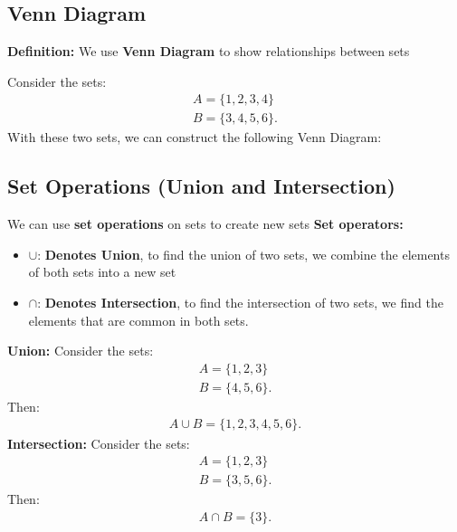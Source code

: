\documentclass{report}
\begin{document}
    \pagebreak \bigbreak \noindent
    \subsection{Venn Diagram}
    \smallbreak \noindent
    \begin{mdframed}
        \textbf{Definition:}
         We use \textbf{Venn Diagram} to show relationships between sets
    \end{mdframed}
    \bigbreak \noindent 
    Consider the sets:
    \begin{align*}
        A = \{1,2,3,4\} \\
        B = \{3,4,5,6\}
    .\end{align*}
    With these two sets, we can construct the following Venn Diagram:
    \begin{figure}[ht]
        \centering
        \label{fig:venn}
    \end{figure}

    \bigbreak \noindent \bigbreak \noindent 
    \subsection{Set Operations (Union and Intersection)}
    \bigbreak \noindent 
    We can use \textbf{set operations} on sets to create new sets
    \bigbreak \noindent 
    \textbf{Set operators:}
    \begin{itemize}
        \item $\cup$: \textbf{Denotes Union}, to find the union of two sets, we combine the elements of both sets into a new set
        \item $\cap$: \textbf{Denotes Intersection}, to find the intersection of two sets, we find the elements that are common in both sets.
    \end{itemize}
    \bigbreak \noindent 
    \textbf{Union:}
    \bigbreak \noindent 
    Consider the sets:
    \begin{align*}
        A = \{1,2,3\} \\
        B = \{4,5,6\}
    .\end{align*}
    Then:
    \begin{align*}
        A \cup B = \{1,2,3,4,5,6\}
    .\end{align*}
    \bigbreak \noindent 
    \textbf{Intersection:}
    \bigbreak \noindent 
    Consider the sets:
    \begin{align*}
        A = \{1,2,3\} \\
        B = \{3,5,6\}
    .\end{align*}
    Then:
    \begin{align*}
        A \cap B = \{3\}
    .\end{align*}
\end{document}

